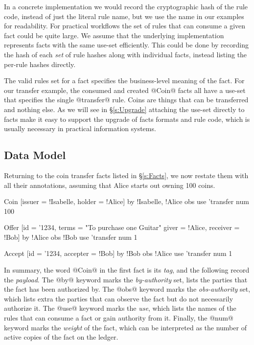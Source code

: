 In a concrete implementation we would record the cryptographic hash of the rule code, instead of just the literal rule name, but we use the name in our examples for readability. For practical workflows the set of rules that can consume a given fact could be quite large. We assume that the underlying implementation represents facts with the same use-set efficiently. This could be done by recording the hash of each \emph{set} of rule hashes along with individual facts, instead listing the per-rule hashes directly.

The valid rules set for a fact specifies the business-level meaning of the fact. For our transfer example, the consumed and created @Coin@ facts all have a use-set that specifies the single @transfer@ rule. Coins are things that can be transferred and nothing else. As we will see in \S\ref{s:Upgrade} attaching the use-set directly to facts make it easy to support the upgrade of facts formats and rule code, which is usually necessary in practical information systems.


\subsection{Data Model}
\label{s:NowWithMetadata}
\label{s:DataModel}
Returning to the coin transfer facts listed in \S\ref{s:Facts}, we now restate them with all their annotations, assuming that Alice starts out owning 100 coins.
\begin{small}
\begin{code}
 Coin   [issuer = !Isabelle, holder  = !Alice]
    by  {!Isabelle, !Alice}  obs {}
    use {'transfer}          num 100

 Offer  [id = '1234, terms = "To purchase one Guitar"
         giver = !Alice, receiver = !Bob]
    by  {!Alice}             obs {!Bob}
    use {'transfer}          num 1

 Accept [id = '1234, accepter = !Bob]
    by  {!Bob}               obs {!Alice}
    use {'transfer}          num 1
\end{code}
\end{small}
In summary, the word @Coin@ in the first fact is its \emph{tag}, and the following record the \emph{payload}. The @by@ keyword marks the \emph{by-authority} set, lists the parties that the fact has been authorized by. The @obs@ keyword marks the \emph{obs-authority} set, which lists extra the parties that can observe the fact but do not necessarily authorize it. The @use@ keyword marks the \emph{use}, which lists the names of the rules that can consume a fact or gain authority from it. Finally, the @num@ keyword marks the \emph{weight} of the fact, which can be interpreted as the number of active copies of the fact on the ledger.

